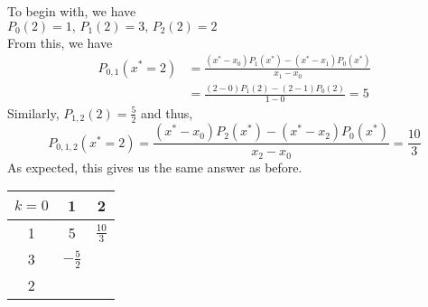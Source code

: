 \begin{soln}
    To begin with, we have\\
    $P_0(2) = 1 \text{, } P_1(2) = 3 \text{, } P_2(2) = 2$\\
    From this, we have
    \begin{equation}
        \begin{split}
            P_{0,1}(x^*=2) &= \frac{(x^*-x_0)P_1(x^*)-(x^*-x_1)P_0(x^*)}{x_1 - x_0} \\
            &= \frac{(2-0)P_1(2)-(2-1)P_0(2)}{1 - 0} = 5
        \end{split}
    \end{equation}
    Similarly, $P_{1,2}(2) = \frac{5}{2}$ and thus,
    $$P_{0,1,2}(x^* = 2) = \frac{(x^*-x_0)P_2(x^*)-(x^*-x_2)P_0(x^*)}{x_2 - x_0} = \frac{10}{3}$$
    As expected, this gives us the same answer as before.

    \begin{center}
        \begin{tabular}{|ccc|}
             \hline
             $k = 0$& 1 & 2\\
             \hline
             1& 5 & $\frac{10}{3}$ \\
             3 & $-\frac{5}{2}$ & \\
             2 &  & \\
             
             \hline
         \end{tabular}
     \end{center}
\end{soln}


